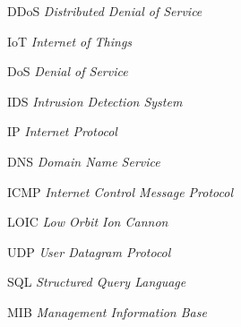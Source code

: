 \begin{siglas}\setlength{\labelwidth}{15ex} \setlength{\itemsep}{0.0001\baselineskip}
  \item[DDoS] \textit{Distributed Denial of Service} 
  \item[IoT] \textit{Internet of Things}
  \item[DoS] \textit{Denial of Service}
  \item[IDS] \textit{Intrusion Detection System}
  \item[IP] \textit{Internet Protocol}
  \item[DNS] \textit{Domain Name Service}
  \item[ICMP] \textit{Internet Control Message Protocol}
  \item[LOIC] \textit{Low Orbit Ion Cannon}
  \item[UDP] \textit{User Datagram Protocol}
  \item[SQL] \textit{Structured Query Language}
  \item[MIB] \textit{Management Information Base}
  
  
  
   
\end{siglas}
